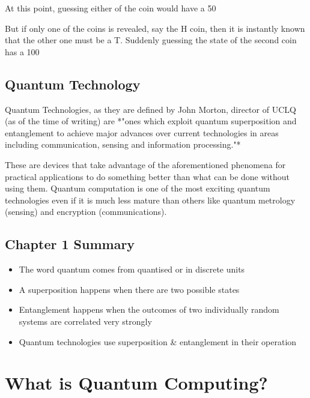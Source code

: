 \documentclass{book}
\begin{document}
At this point, guessing either of the coin would have a 50%

But if only one of the coins is revealed, say the H coin, then it is instantly known that the other one must be a T. Suddenly guessing the state of the second coin has a 100%

\subsection{Quantum Technology}

Quantum Technologies, as they are defined by John Morton, director of UCLQ (as of the time of writing) are *"ones which exploit quantum superposition and entanglement to achieve major advances over current technologies in areas including communication, sensing and information processing."*

These are devices that take advantage of the aforementioned phenomena for practical applications to do something better than what can be done without using them. Quantum computation is one of the most exciting quantum technologies even if it is much less mature than others like quantum metrology (sensing) and encryption (communications).


\subsection{Chapter 1 Summary} 

\begin{itemize}

    \item The word quantum comes from quantised or in discrete units 
    \item A superposition happens when there are two possible states
    \item Entanglement happens when the outcomes of two individually random systems are correlated very strongly 
    \item Quantum technologies use superposition \& entanglement in their operation 
    
\end{itemize}

\section{What is Quantum Computing?}
\end{document}
